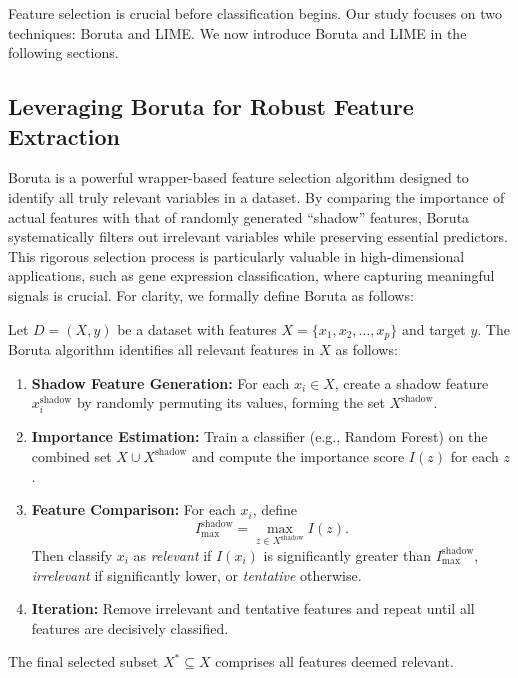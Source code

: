 Feature selection is crucial before classification begins. Our study focuses on two techniques: Boruta and LIME. 
We now introduce Boruta and LIME in the following sections.

\subsection{Leveraging Boruta for Robust Feature Extraction}
Boruta \cite{kursa2010boruta,zhou2023diabetes} is a powerful wrapper-based feature selection algorithm designed to identify all truly relevant variables in a dataset. By comparing the importance of actual features with that of randomly generated ``shadow'' features, Boruta systematically filters out irrelevant variables while preserving essential predictors. This rigorous selection process is particularly valuable in high-dimensional applications, such as gene expression classification, where capturing meaningful signals is crucial. For clarity, we formally define Boruta as follows:
\begin{definition}
Let \( D = (X, y) \) be a dataset with features \( X = \{x_1, x_2, \dots, x_p\} \) and target \( y \). The Boruta algorithm identifies all relevant features in \( X \) as follows:
\begin{enumerate}
    \item \textbf{Shadow Feature Generation:} For each \( x_i \in X \), create a shadow feature \( x_i^{\text{shadow}} \) by randomly permuting its values, forming the set \( X^{\text{shadow}} \).
    \item \textbf{Importance Estimation:} Train a classifier (e.g., Random Forest) on the combined set \( X \cup X^{\text{shadow}} \) and compute the importance score \( I(z) \) for each \( z \).
    \item \textbf{Feature Comparison:} For each \( x_i \), define
    \[
    I^{\text{shadow}}_{\max} = \max_{z \in X^{\text{shadow}}} I(z).
    \]
    Then classify \( x_i \) as \emph{relevant} if \( I(x_i) \) is significantly greater than \( I^{\text{shadow}}_{\max} \), \emph{irrelevant} if significantly lower, or \emph{tentative} otherwise.
    \item \textbf{Iteration:} Remove irrelevant and tentative features and repeat until all features are decisively classified.
\end{enumerate}
The final selected subset \( X^* \subseteq X \) comprises all features deemed relevant.
\end{definition}

